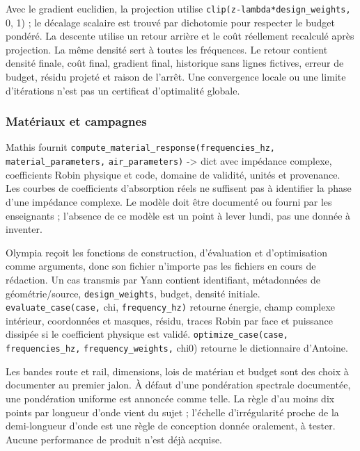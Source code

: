 \documentclass[11pt,a4paper]{article}
\begin{document}
Avec le gradient euclidien, la projection utilise {\small\ttfamily \nolinkurl{clip(z-lambda*design_weights,} 0, 1)} ; le décalage scalaire est trouvé par dichotomie pour respecter le budget pondéré. La descente utilise un retour arrière et le coût réellement recalculé après projection. La même densité sert à toutes les fréquences. Le retour contient densité finale, coût final, gradient final, historique sans lignes fictives, erreur de budget, résidu projeté et raison de l'arrêt. Une convergence locale ou une limite d'itérations n'est pas un certificat d'optimalité globale.

\subsubsection{Matériaux et campagnes}

Mathis fournit {\small\ttfamily \nolinkurl{compute_material_response(frequencies_hz,} \nolinkurl{material_parameters,} \nolinkurl{air_parameters)} -> dict} avec impédance complexe, coefficients Robin physique et code, domaine de validité, unités et provenance. Les courbes de coefficients d'absorption réels ne suffisent pas à identifier la phase d'une impédance complexe. Le modèle doit être documenté ou fourni par les enseignants ; l'absence de ce modèle est un point à lever lundi, pas une donnée à inventer.

Olympia reçoit les fonctions de construction, d'évaluation et d'optimisation comme arguments, donc son fichier n'importe pas les fichiers en cours de rédaction. Un cas transmis par Yann contient identifiant, métadonnées de géométrie/source, {\small\ttfamily \nolinkurl{design_weights}}, budget, densité initiale. {\small\ttfamily \nolinkurl{evaluate_case(case,} chi, \nolinkurl{frequency_hz)}} retourne énergie, champ complexe intérieur, coordonnées et masques, résidu, traces Robin par face et puissance dissipée si le coefficient physique est validé. {\small\ttfamily \nolinkurl{optimize_case(case,} \nolinkurl{frequencies_hz,} \nolinkurl{frequency_weights,} chi0)} retourne le dictionnaire d'Antoine.

Les bandes route et rail, dimensions, lois de matériau et budget sont des choix à documenter au premier jalon. À défaut d'une pondération spectrale documentée, une pondération uniforme est annoncée comme telle. La règle d'au moins dix points par longueur d'onde vient du sujet ; l'échelle d'irrégularité proche de la demi-longueur d'onde est une règle de conception donnée oralement, à tester. Aucune performance de produit n'est déjà acquise.
\end{document}
